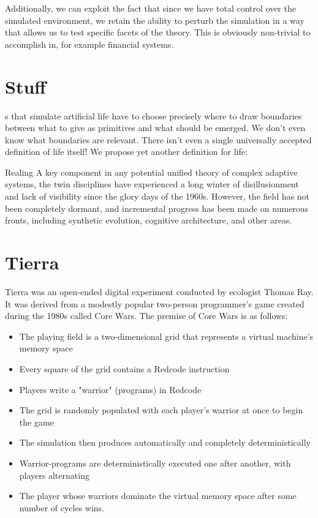 \documentclass{article}
\begin{document}
Additionally, we can exploit the fact that since we have total control over the simulated environment, we retain the ability to perturb the simulation in a way that allows us to test specific facets of the theory. This is obviously non-trivial to accomplish in, for example financial systems.

\section{Stuff}

s that simulate artificial life have to choose precisely where to draw boundaries between what to give as primitives and what should be emerged. We don't even know what boundaries are relevant. There isn't even a single universally accepted definition of life itself! We propose yet another definition for life:

Realing A key component in any potential unified theory of complex adaptive systems, the twin disciplines have experienced a long winter of disillusionment and lack of visibility since the glory days of the 1960s. However, the field has not been completely dormant, and incremental progress has been made on numerous fronts, including synthetic evolution, cognitive architecture, and other areas.

\section{Tierra}
Tierra was an open-ended digital experiment conducted by ecologist Thomas Ray. It was derived from a modestly popular two-person programmer's game created during the 1980s called Core Wars. The premise of Core Wars is as follows:

\begin{itemize}
\item The playing field is a two-dimensional grid that represents a virtual machine's memory space
\item Every square of the grid contains a Redcode instruction
\item Players write a "warrior" (programs) in Redcode
\item The grid is randomly populated with each player's warrior at once to begin the game
\item The simulation then produces automatically and completely deterministically
\item Warrior-programs are deterministically executed one after another, with players alternating 
\item The player whose warriors dominate the virtual memory space after some number of cycles wins.
\end{itemize}
\end{document}
